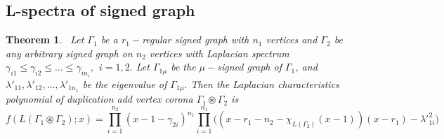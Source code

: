 \documentclass[12pt,a4paper]{article}
\newtheorem{theorem}{Theorem}[section]
\theoremstyle{definition}
\theoremstyle{remark}
\begin{document}
    \subsection{L-spectra of signed graph}
    \begin{theorem}~\label{TH2}
         Let $\Gamma_1$ be a $r_1-$regular signed graph with $n_1$ vertices and $\Gamma_2$ be any arbitrary signed graph on $n_2$ vertices with Laplacian spectrum $\gamma_{i1}\leq\gamma_{i2}\leq\ldots\leq\gamma_{in_i},~~i=1,2.$ Let $\Gamma_{1\mu}$ be the $\mu-$signed graph of $\Gamma_1$, and $\lambda'_{11},\lambda'_{12},\ldots,\lambda'_{1n_1}$ be the eigenvalue of $\Gamma_{1\mu}.$ Then the Laplacian characteristics polynomial of duplication add vertex corona $\Gamma_1\circledast\Gamma_2$ is $$f(L(\Gamma_1\circledast\Gamma_2);x)=\prod_{i=1}^{n_2}(x-1-\gamma_{2i})^{n_1} \prod_{i=1}^{n_1}\big((x-r_1-n_2-\chi_{L(\Gamma_2)}(x-1))(x-r_1)-{\lambda'}_{1i}^2\big)$$
    \end{theorem}
        
\end{document}
